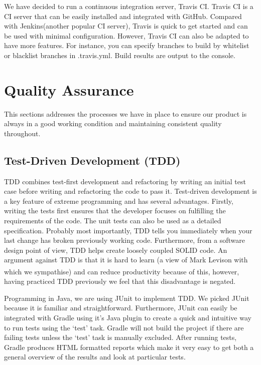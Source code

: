\documentclass[10pt, a4paper]{article}
\begin{document}
We have decided to run a continuous integration server, Travis CI. Travis CI is a CI server that can be easily installed and integrated with GitHub.  Compared with Jenkins(another popular CI server), Travis is quick to get started and can be used with minimal configuration. However, Travis CI can also be adapted to have more features. For instance, you can specify branches to build by whitelist or blacklist branches in .travis.yml. Build results are output to the console.

\section{Quality Assurance}

This sections addresses the processes we have in place to ensure our product is always in a good working condition and maintaining consistent quality throughout.

\subsection{Test-Driven Development (TDD)}

TDD combines test-first development and refactoring by writing an initial test case before writing and refactoring the code to pass it. Test-driven development is a key feature of extreme programming and has several advantages. Firstly, writing the tests first ensures that the developer focuses on fulfilling the requirements of the code. The unit tests can also be used as a detailed specification. Probably most importantly, TDD tells you immediately when your last change has broken previously working code. Furthermore, from a software design point of view, TDD helps create loosely coupled SOLID code. An argument against TDD is that it is hard to learn (a view of Mark Levison with which we sympathise\textsuperscript{\cite{mark}}) and can reduce productivity because of this, however, having practiced TDD previously we feel that this disadvantage is negated. 

Programming in Java, we are using JUnit to implement TDD. We picked JUnit because it is familiar and straightforward. Furthermore, JUnit can easily be integrated with Gradle using it’s Java plugin to create a quick and intuitive way to run tests using the ‘test’ task. Gradle will not build the project if there are failing tests unless the ‘test’ task is manually excluded. After running tests, Gradle produces HTML formatted reports which make it very easy to get both a general overview of the results and look at particular tests.
\end{document}
